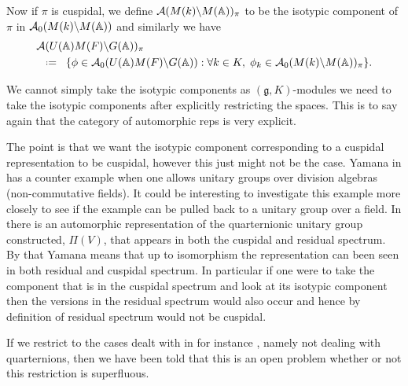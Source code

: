 Now if \(\pi\) is cuspidal, we define \(\mathcal{A}(M(k) \backslash M(\A))_\pi\) to be the isotypic component of \(\pi\) in \(\mathcal{A}_0(M(k) \backslash M(\A))\) and similarly we have 
\begin{align*}
	&\mathcal{A}(U(\A)M(F) \backslash G(\A))_\pi \\
&\defeq \{\phi \in \mathcal{A}_0(U(\A)M(F) \backslash G(\A)) : \forall k\in K, \; \phi_k\in\mathcal{A}_0(M(k) \backslash M(\A))_{\pi} \}.
\end{align*}

\begin{remark}
    We cannot simply take the isotypic components as \((\mathfrak{g}, K)\)-modules we need to take the isotypic components after explicitly restricting the spaces. This is to say again that the category of automorphic reps is very explicit. 
\end{remark}

The point is that we want the isotypic component corresponding to a cuspidal representation to be cuspidal, however this just might not be the case. 
Yamana in \cite[Rm. 7.12]{yamanaSiegelWeilFormulaQuaternionic2013} has a counter example when one allows unitary groups over division algebras (non-commutative fields). It could be interesting to investigate this example more closely to see if the example can be pulled back to a unitary group over a field. In \cite{yamanaSiegelWeilFormulaQuaternionic2013} there is an automorphic representation of the quarternionic unitary group constructed, \(\Pi(V)\), that appears in both the cuspidal and residual spectrum. By that Yamana means that up to isomorphism the representation can been seen in both residual and cuspidal spectrum. In particular if one were to take the component that is in the cuspidal spectrum and look at its isotypic component then the versions in the residual spectrum would also occur and hence by definition of residual spectrum would not be cuspidal.

If we restrict to the cases dealt with in for instance \cite{moeglinSpectralDecompositionEisenstein1995}, namely not dealing with quarternions, then we have been told that this is an open problem whether or not this restriction is superfluous. 




